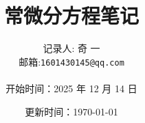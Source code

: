 
\usepackage[UTF8]{ctex}
\usepackage{amsmath} 
\usepackage{biblatex}  
\usepackage{hyperref}  %
\usepackage{amssymb}
\usepackage{mathtools}   %
\usepackage{xcolor}
\usepackage{soul}
\usepackage{bookmark}  %
\usepackage{amsthm}

  

\title{\heiti \Huge 常微分方程笔记\\[3cm]}   %


\author{\kaishu \Large 记录人: 奇 一\\ 邮箱:\texttt{1601430145@qq.com}\\ \\开始时间：2025 年 12 月 14 日}
\date{更新时间：\today}
\hypersetup{
    hidelinks
}

\usepackage{xcolor}
\renewcommand{\thesection}{\textcolor{blue}{\LARGE\arabic{section}}}
\renewcommand{\thesubsection}{\Large\arabic{section}.\arabic{subsection}}
\renewcommand{\thesubsubsection}{\large\arabic{section}.\arabic{subsection}.\arabic{subsubsection}}
